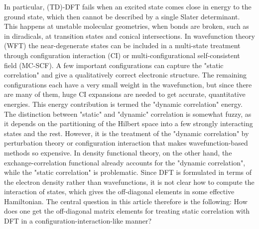 \documentclass[journal=jpclcd,manuscript=letter]{achemso}
\begin{document}
In particular, (TD)-DFT fails when an excited state comes close in energy to the ground state,
which then cannot be described by a single Slater determinant. This happens at unstable molecular
geometries, when bonds are broken, such as in diradicals, at transition states and conical intersections.
In wavefunction theory (WFT) the near-degenerate states can be included in a multi-state treatment
through configuration interaction (CI) or multi-configurational self-consistent field (MC-SCF).
A few important configurations can capture the "static correlation" and give a qualitatively correct
electronic structure. The remaining configurations each have a very small weight in the wavefunction,
but since there are many of them, huge CI expansions are needed to get accurate, quantitative energies.
This energy contribution is termed the "dynamic correlation" energy.
The distinction between "static" and "dynamic" correlation is somewhat fuzzy, as it depends on the partitioning
of the Hilbert space into a few strongly interacting states and the rest. However, it is the treatment of the
"dynamic correlation" by perturbation theory or configuration interaction
that makes wavefunction-based methods so expensive. In density functional theory, on the other hand, the exchange-correlation
functional already accounts for the "dynamic correlation", while the "static correlation" is problematic.
Since DFT is formulated in terms of the electron density rather than wavefunctions, it is not clear how to compute
the interaction of states, which gives the off-diagonal elements in some effective Hamiltonian.
The central question in this article therefore is the following: 
How does one get the off-diagonal matrix elements for treating static correlation with DFT in a configuration-interaction-like manner?
\end{document}
